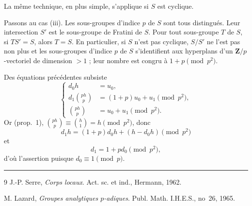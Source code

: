 \documentclass[11pt]{article}
\newcommand{\Z}{\mathbf{Z}}
\begin{document}
La même technique, en plus simple, s'applique si \(S\) est cyclique.

Passons au cas (iii). Les sous-groupes d'indice \(p\) de \(S\) sont tous
distingués. Leur intersection \(S'\) est le sous-groupe de Fratini de \(S\).
Pour tout sous-groupe \(T\) de \(S\), si \(TS'=S\), alors \(T=S\). En
particulier, si \(S\) n'est pas cyclique, \(S/S'\) ne l'est pas non plus et les
sous-groupes d'indice \(p\) de \(S\) s'identifient aux hyperplans d'un
\(\Z/p\)-vectoriel de dimension \(>1\) ; leur nombre est congru à
\(1+p\pmod {p^2}\).

Des équations précédentes subsiste
\[
\left\{
\begin{aligned}
 d_0h&=u_0,\\
 d_1\binom{ph}{p}&=(1+p)u_0+u_1\pmod {p^2},\\
 \binom{ph}{p}&=u_0+u_1\pmod {p^2}.
\end{aligned}
\right.
\]
Or (prop.~1), \(\binom{ph}{p}\equiv\binom{h}{1}=h\pmod {p^2}\), donc
\[
        d_1h=(1+p)d_0h+(h-d_0h)\pmod {p^2}
\]
et
\[
        d_1=1+pd_0\pmod {p^2},
\]
d'où l'assertion puisque \(d_0\equiv1\pmod p\).

\begin{center}
\rule{0.25\textwidth}{0.4pt}
\end{center}

\begin{thebibliography}{9}
J.-P. Serre, \emph{Corps locaux}. Act. sc. et ind., Hermann, 1962.

M. Lazard, \emph{Groupes analytiques \(p\)-adiques}. Publ. Math. I.H.E.S.,
no~26, 1965.
\end{thebibliography}
\end{document}
